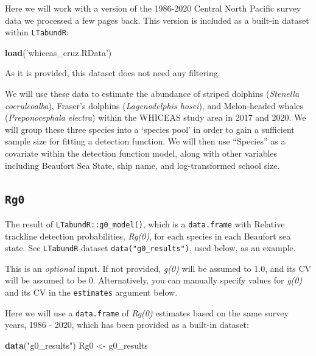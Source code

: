 \documentclass[
]{book}
\newenvironment{Shaded}{\begin{snugshade}}{\end{snugshade}}
\newcommand{\KeywordTok}[1]{\textcolor[rgb]{0.13,0.29,0.53}{\textbf{#1}}}
\newcommand{\NormalTok}[1]{#1}
\newcommand{\StringTok}[1]{\textcolor[rgb]{0.31,0.60,0.02}{#1}}
\begin{document}
Here we will work with a version of the 1986-2020 Central North Pacific survey data we processed a few pages back. This version is included as a built-in dataset within \texttt{LTabundR}:

\begin{Shaded}
\begin{Highlighting}[]
\KeywordTok{load}\NormalTok{(}\StringTok{'whiceas_cruz.RData'}\NormalTok{)}
\end{Highlighting}
\end{Shaded}

As it is provided, this dataset does not need any filtering.

We will use these data to estimate the abundance of striped dolphins (\emph{Stenella coeruleoalba}), Fraser's dolphins (\emph{Lagenodelphis hosei}), and Melon-headed whales (\emph{Preponocephala electra}) within the WHICEAS study area in 2017 and 2020. We will group these three species into a `species pool' in order to gain a sufficient sample size for fitting a detection function. We will then use ``Species'' as a covariate within the detection function model, along with other variables including Beaufort Sea State, ship name, and log-transformed school size.

\hypertarget{rg0}{%
\subsection*{\texorpdfstring{\texttt{Rg0}}{Rg0}}\label{rg0}}

The result of \texttt{LTabundR::g0\_model()}, which is a \texttt{data.frame} with Relative trackline detection probabilities, \emph{Rg(0)}, for each species in each Beaufort sea state. See \texttt{LTabundR} dataset \texttt{data("g0\_results")}, used below, as an example.

This is an \emph{optional} input. If not provided, \emph{g(0)} will be assumed to 1.0, and its CV will be assumed to be 0. Alternatively, you can manually specify values for \emph{g(0)} and its CV in the \texttt{estimates} argument below.

Here we will use a \texttt{data.frame} of \emph{Rg(0)} estimates based on the same survey years, 1986 - 2020, which has been provided as a built-in dataset:

\begin{Shaded}
\begin{Highlighting}[]
\KeywordTok{data}\NormalTok{(}\StringTok{"g0_results"}\NormalTok{)}
\NormalTok{Rg0 <-}\StringTok{ }\NormalTok{g0_results}
\end{Highlighting}
\end{Shaded}
\end{document}
